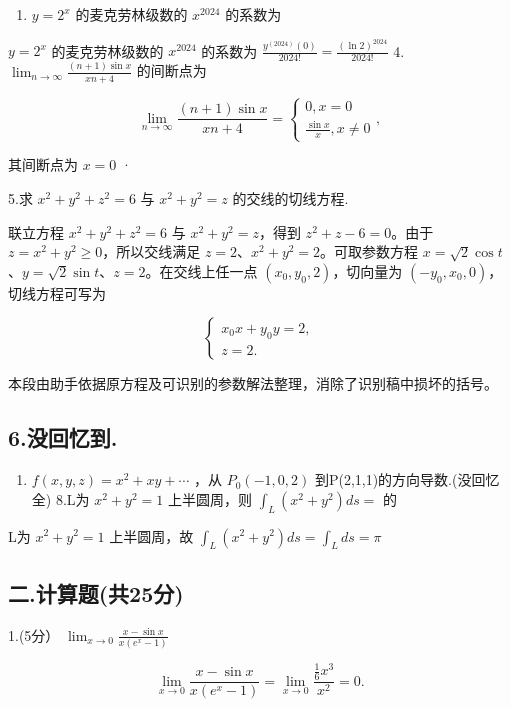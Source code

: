 \documentclass[11pt,fontset=fandol]{ctexart}
\providecommand{\tightlist}{\setlength{\itemsep}{0pt}\setlength{\parskip}{0pt}}
\begin{document}
\begin{enumerate}
\def\labelenumi{\arabic{enumi}.}
\setcounter{enumi}{2}
\tightlist
\item
  \(y = 2 ^ { x }\) 的麦克劳林级数的 \(x ^ { 2 0 2 4 }\) 的系数为
\end{enumerate}

\(y = 2 ^ { x }\) 的麦克劳林级数的 \(x ^ { 2 0 2 4 }\) 的系数为
\({ \frac { y ^ { ( 2 0 2 4 ) } ( 0 ) } { 2 0 2 4 ! } } = { \frac { ( \ln 2 ) ^ { 2 0 2 4 } } { 2 0 2 4 ! } }\)
4.
\(\lim _ { n \to \infty } { \frac { ( n + 1 ) \sin x } { x n + 4 } }\)
的间断点为

\[
\lim _ { n \to \infty } { \frac { ( n + 1 ) \sin x } { x n + 4 } } = \left\{ { \begin{array} { l } { 0 , x = 0 } \\ { \displaystyle { \frac { \sin x } { x } } , x \neq 0 } \end{array} } , \right.
\]

其间断点为 \(x = 0\) ·

5.求 \(x ^ { 2 } + y ^ { 2 } + z ^ { 2 } = 6\) 与
\(x ^ { 2 } + y ^ { 2 } = z\) 的交线的切线方程.

联立方程 \(x^2+y^2+z^2=6\) 与 \(x^2+y^2=z\)，得到 \(z^2+z-6=0\)。由于
\(z=x^2+y^2\geq0\)，所以交线满足 \(z=2\)、\(x^2+y^2=2\)。可取参数方程
\(x=\sqrt2\cos t\)、\(y=\sqrt2\sin t\)、\(z=2\)。在交线上任一点
\((x_0,y_0,2)\)，切向量为 \((-y_0,x_0,0)\)，切线方程可写为

\[
\begin{cases}
x_0x+y_0y=2,\\
z=2.
\end{cases}
\]

本段由助手依据原方程及可识别的参数解法整理，消除了识别稿中损坏的括号。

\subsection{6.没回忆到.}\label{ux6ca1ux56deux5fc6ux5230.}

\begin{enumerate}
\def\labelenumi{\arabic{enumi}.}
\setcounter{enumi}{6}
\tightlist
\item
  \(f ( x , y , z ) = x ^ { 2 } + x y + \cdots\) ，从
  \(P _ { 0 } ( - 1 , 0 , 2 )\) 到P(2,1,1)的方向导数.(没回忆全) 8.L为
  \(x ^ { 2 } + y ^ { 2 } = 1\) 上半圆周，则
  \(\int _ { L } ( x ^ { 2 } + y ^ { 2 } ) d s =\) 的
\end{enumerate}

L为 \(x ^ { 2 } + y ^ { 2 } = 1\) 上半圆周，故
\(\int _ { L } ( x ^ { 2 } + y ^ { 2 } ) d s = \int _ { L } d s = \pi\)

\subsection{二.计算题(共25分)}\label{ux4e8c.ux8ba1ux7b97ux9898ux517125ux5206}

1.(5分）
\(\lim _ { x \to 0 } { \frac { x - \sin { x } } { x ( e ^ { x } - 1 ) } }\)

\[
\lim _ { x \to 0 } { \frac { x - \sin x } { x ( e ^ { x } - 1 ) } } = \lim _ { x \to 0 } { \frac { \frac { 1 } { 6 } x ^ { 3 } } { x ^ { 2 } } } = 0 .
\]
\end{document}
